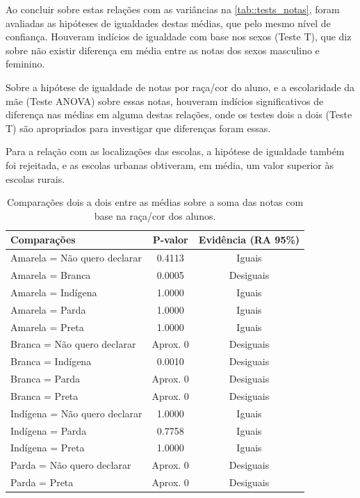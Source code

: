 Ao concluir sobre estas relações com as variâncias na \autoref{tab::tests_notas}, foram avaliadas as
hipóteses de igualdades destas médias, que pelo mesmo nível de confiança. Houveram indícios de igualdade 
com base nos sexos (Teste T), que diz sobre não existir diferença em média entre as notas dos sexos masculino e feminino.

Sobre a hipótese de igualdade de notas por raça/cor do aluno, e a escolaridade da mãe (Teste ANOVA)
sobre essas notas, houveram indícios significativos de diferença nas médias em alguma destas relações,
onde os testes dois a dois (Teste T) são apropriados para investigar que diferenças foram essas.

Para a relação com as localizações das escolas, a hipótese de igualdade também foi rejeitada, e as escolas 
urbanas obtiveram, em média, um valor superior às escolas rurais.


\newpage

\begin{table}[htb]
    \centering
\caption{Comparações dois a dois entre as médias sobre a soma das notas
        com base na raça/cor dos alunos.\label{tab:raca_cor_notas}}
    \begin{tabular}{lcc}
    \toprule
    Comparações & P-valor & Evidência (RA 95\%)\\
    \midrule \midrule
    Amarela = Não quero declarar & 0.4113 & Iguais\\
    Amarela = Branca & 0.0005 & Desiguais\\
    Amarela = Indígena & 1.0000 & Iguais\\
    Amarela = Parda & 1.0000 & Iguais\\
    Amarela = Preta & 1.0000 & Iguais\\
    Branca = Não quero declarar & Aprox. 0 & Desiguais\\
    Branca = Indígena & 0.0010 & Desiguais\\
    Branca = Parda & Aprox. 0 & Desiguais\\
    Branca = Preta & Aprox. 0 & Desiguais\\
    Indígena = Não quero declarar & 1.0000 & Iguais\\
    Indígena = Parda & 0.7758 & Iguais\\
    Indígena = Preta & 1.0000  & Iguais\\
    Parda = Não quero declarar & Aprox. 0 & Desiguais\\
    Parda = Preta & Aprox. 0 & Desiguais\\
    \bottomrule
    \end{tabular}
    \centering
    
\end{table}

